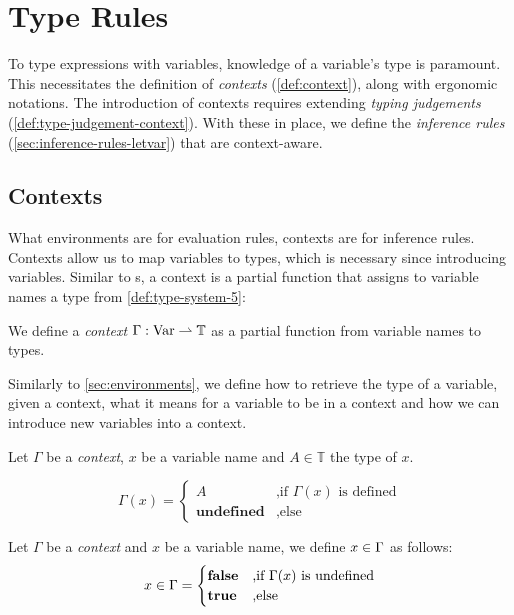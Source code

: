 \section{Type Rules}\label{sec:type-rules-5}

To type expressions with variables, knowledge of a variable's type is paramount. This necessitates the definition of \emph{contexts} (\cref{def:context}), along with ergonomic notations. The introduction of contexts requires extending \emph{typing judgements} (\cref{def:type-judgement-context}). With these in place, we define the \emph{inference rules} (\cref{sec:inference-rules-letvar}) that are context-aware.

\subsection{Contexts}

What environments are for evaluation rules, contexts are for inference rules. Contexts allow us to map variables to types, which is necessary since introducing variables. Similar to s, a context is a partial function that assigns to variable names a type from \cref{def:type-system-5}:

\begin{definition}[Context]\label{def:context}
   We define a \emph{context} \(\Gamma : \text{Var} \rightharpoonup \text{\ensuremath{\mathbb{T}}}\) as a partial function from variable names to types.
\end{definition}

Similarly to \cref{sec:environments}, we define how to retrieve the type of a variable, given a context, what it means for a variable to be in a context and how we can introduce new variables into a context. 

\begin{definition}\label{def:context-getter}
   Let \(\Gamma\) be a \emph{context}, \(x\) be a variable name and \(A \in \mathbb{T}\) the type of \(x\). 

   \[
      \Gamma(x) = 
      \begin{cases}
	 A		      & \mbox{,if } \Gamma(x) \text{ is defined}\\
	 \textbf{undefined}   & \mbox{,else } 
      \end{cases}
   \]

\end{definition}

\begin{definition}\label{def:in-context}
   Let \(\Gamma\) be a \emph{context} and \(x\) be a variable name, we define \(x \in \Gamma\) as follows:
   \[
      x \in \Gamma =
      \begin{cases}
	 \mathbf{false}	     & \text{,if } \Gamma(x) \text{ is undefined}\\
	 \mathbf{true}	     & \text{,else}
      \end{cases}
   \]
\end{definition}

